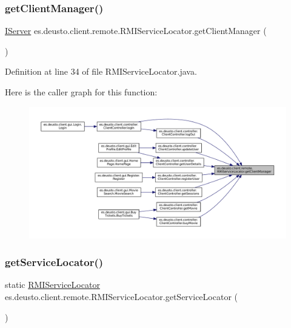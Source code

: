 \subsubsection{\texorpdfstring{getClientManager()}{getClientManager()}}
{\footnotesize\ttfamily \mbox{\hyperlink{interfacees_1_1deusto_1_1server_1_1_i_server}{I\+Server}} es.\+deusto.\+client.\+remote.\+R\+M\+I\+Service\+Locator.\+get\+Client\+Manager (\begin{DoxyParamCaption}{ }\end{DoxyParamCaption})}



Definition at line 34 of file R\+M\+I\+Service\+Locator.\+java.

Here is the caller graph for this function\+:
\nopagebreak
\begin{figure}[H]
\begin{center}
\leavevmode
\includegraphics[width=350pt]{classes_1_1deusto_1_1client_1_1remote_1_1_r_m_i_service_locator_ade08376a63a3e1a5ca512986e86478d5_icgraph}
\end{center}
\end{figure}
\mbox{\label{classes_1_1deusto_1_1client_1_1remote_1_1_r_m_i_service_locator_a8054c4752675c3d8703a0ba79fb1c2c0}} 
\subsubsection{\texorpdfstring{getServiceLocator()}{getServiceLocator()}}
{\footnotesize\ttfamily static \mbox{\hyperlink{classes_1_1deusto_1_1client_1_1remote_1_1_r_m_i_service_locator}{R\+M\+I\+Service\+Locator}} es.\+deusto.\+client.\+remote.\+R\+M\+I\+Service\+Locator.\+get\+Service\+Locator (\begin{DoxyParamCaption}{ }\end{DoxyParamCaption})\hspace{0.3cm}{\ttfamily [static]}}



